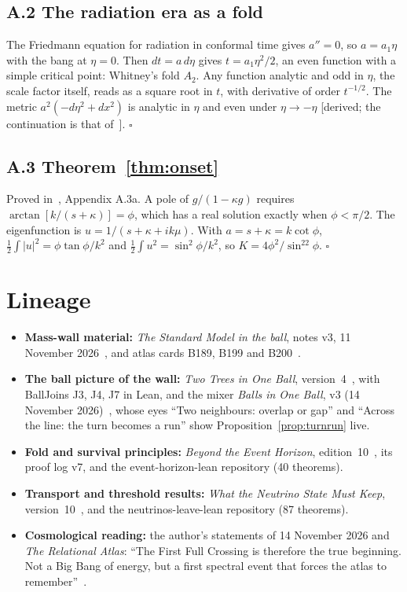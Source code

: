 \documentclass[11pt]{article}
\theoremstyle{definition}\newtheorem{hypothesis}{Hypothesis}\newtheorem{prediction}{Prediction}
\theoremstyle{remark}\newtheorem{remark}[theorem]{Remark}
\newcommand{\grade}[1]{\textsf{\small[#1]}}
\begin{document}
\subsection*{A.2 The radiation era as a fold}
The Friedmann equation for radiation in conformal time gives $a''=0$, so $a=a_1\eta$ with the bang at $\eta=0$. Then $dt=a\,d\eta$ gives $t=a_1\eta^2/2$, an even function with a simple critical point: Whitney's fold $A_2$. Any function analytic and odd in $\eta$, the scale factor itself, reads as a square root in $t$, with derivative of order $t^{-1/2}$. The metric $a^2(-d\eta^2+dx^2)$ is analytic in $\eta$ and even under $\eta\to-\eta$ \grade{derived; the continuation is that of~\cite{BFT}}. $\square$

\subsection*{A.3 Theorem~\ref{thm:onset}}
Proved in~\cite{NU10}, Appendix A.3a. A pole of $g/(1-\kappa g)$ requires $\arctan[k/(s+\kappa)]=\phi$, which has a real solution exactly when $\phi<\pi/2$. The eigenfunction is $u=1/(s+\kappa+ik\mu)$. With $a=s+\kappa=k\cot\phi$, $\tfrac12\!\int|u|^2=\phi\tan\phi/k^2$ and $\tfrac12\!\int u^2=\sin^2\phi/k^2$, so $K=4\phi^2/\sin^22\phi$. $\square$

\section{Lineage}
\begin{itemize}[nosep]
\item \textbf{Mass-wall material:} \emph{The Standard Model in the ball}, notes v3, 11 November 2026~\cite{SMball}, and atlas cards B189, B199 and B200~\cite{Atlas}.
\item \textbf{The ball picture of the wall:} \emph{Two Trees in One Ball}, version~4~\cite{TwoTrees}, with BallJoins J3, J4, J7 in Lean, and the mixer \emph{Balls in One Ball}, v3 (14 November 2026)~\cite{Mixer}, whose eyes ``Two neighbours: overlap or gap'' and ``Across the line: the turn becomes a run'' show Proposition~\ref{prop:turnrun} live.
\item \textbf{Fold and survival principles:} \emph{Beyond the Event Horizon}, edition~10~\cite{BH}, its proof log v7, and the event-horizon-lean repository (40 theorems).
\item \textbf{Transport and threshold results:} \emph{What the Neutrino State Must Keep}, version~10~\cite{NU10}, and the neutrinos-leave-lean repository (87 theorems).
\item \textbf{Cosmological reading:} the author's statements of 14 November 2026 and \emph{The Relational Atlas}: ``The First Full Crossing is therefore the true beginning. Not a Big Bang of energy, but a first spectral event that forces the atlas to remember''~\cite{RelAtlas}.
\end{itemize}
\end{document}
